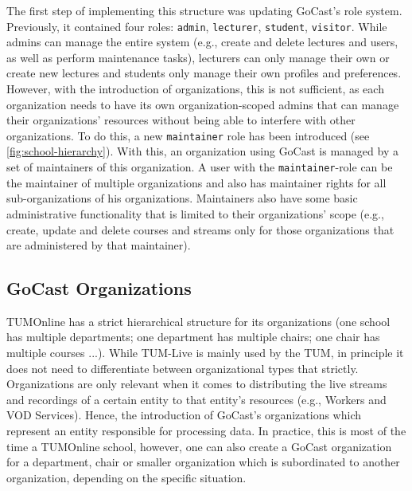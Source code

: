 The first step of implementing this structure was updating GoCast's role system. Previously, it contained four roles: \texttt{admin}, \texttt{lecturer}, \texttt{student}, \texttt{visitor}. While admins can manage the entire system (e.g., create and delete lectures and users, as well as perform maintenance tasks), lecturers can only manage their own or create new lectures and students only manage their own profiles and preferences. However, with the introduction of organizations, this is not sufficient, as each organization needs to have its own organization-scoped admins that can manage their organizations' resources without being able to interfere with other organizations. To do this, a new \texttt{maintainer} role has been introduced (see \autoref{fig:school-hierarchy}).
With this, an organization using GoCast is managed by a set of maintainers of this organization. A user with the \texttt{maintainer}-role can be the maintainer of multiple organizations and also has maintainer rights for all sub-organizations of his organizations.  
Maintainers also have some basic administrative functionality that is limited to their organizations' scope (e.g., create, update and delete courses and streams only for those organizations that are administered by that maintainer). 

\subsection{GoCast Organizations}

TUMOnline has a strict hierarchical structure for its organizations (one school has multiple departments; one department has multiple chairs; one chair has multiple courses ...).
%
While TUM-Live is mainly used by the TUM, in principle it does not need to differentiate between organizational types that strictly. Organizations are only relevant when it comes to distributing the live streams and recordings of a certain entity to that entity's resources (e.g., Workers and VOD Services). Hence, the introduction of GoCast's organizations which represent an entity responsible for processing data. In practice, this is most of the time a TUMOnline school, however, one can also create a GoCast organization for a department, chair or smaller organization which is subordinated to another organization, depending on the specific situation.

